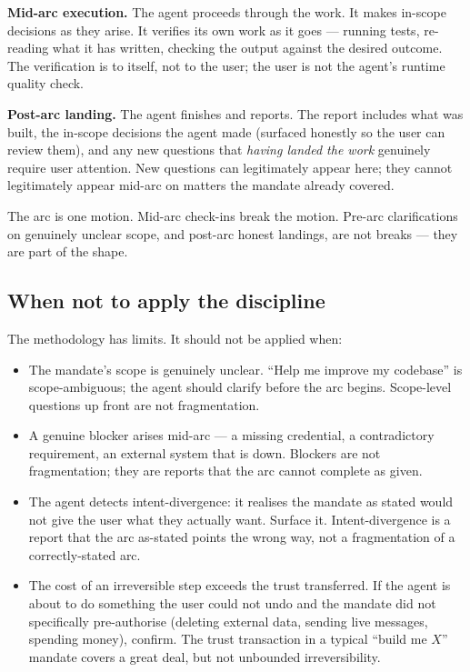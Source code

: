 \documentclass[11pt]{article}
\begin{document}
\textbf{Mid-arc execution.} The agent proceeds through the work. It makes
in-scope decisions as they arise. It verifies its own work as it goes ---
running tests, re-reading what it has written, checking the output against
the desired outcome. The verification is to itself, not to the user; the
user is not the agent's runtime quality check.

\textbf{Post-arc landing.} The agent finishes and reports. The report
includes what was built, the in-scope decisions the agent made (surfaced
honestly so the user can review them), and any new questions that
\emph{having landed the work} genuinely require user attention. New
questions can legitimately appear here; they cannot legitimately appear
mid-arc on matters the mandate already covered.

The arc is one motion. Mid-arc check-ins break the motion. Pre-arc
clarifications on genuinely unclear scope, and post-arc honest landings,
are not breaks --- they are part of the shape.

\subsection{When not to apply the discipline}

The methodology has limits. It should not be applied when:

\begin{itemize}[leftmargin=*]
  \item The mandate's scope is genuinely unclear. ``Help me improve my
  codebase'' is scope-ambiguous; the agent should clarify before the arc
  begins. Scope-level questions up front are not fragmentation.
  \item A genuine blocker arises mid-arc --- a missing credential, a
  contradictory requirement, an external system that is down. Blockers
  are not fragmentation; they are reports that the arc cannot complete
  as given.
  \item The agent detects intent-divergence: it realises the mandate as
  stated would not give the user what they actually want. Surface it.
  Intent-divergence is a report that the arc as-stated points the wrong
  way, not a fragmentation of a correctly-stated arc.
  \item The cost of an irreversible step exceeds the trust transferred.
  If the agent is about to do something the user could not undo and the
  mandate did not specifically pre-authorise (deleting external data,
  sending live messages, spending money), confirm. The trust transaction
  in a typical ``build me $X$'' mandate covers a great deal, but not
  unbounded irreversibility.
\end{itemize}
\end{document}
